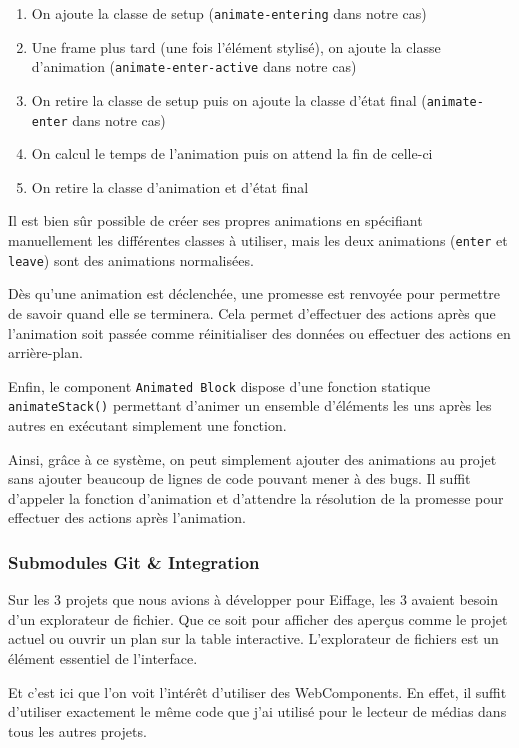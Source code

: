 \begin{enumerate}
    \item On ajoute la classe de setup (\texttt{animate-entering} dans notre cas)
    \item Une frame plus tard (une fois l'élément stylisé), on ajoute la classe d'animation (\texttt{animate-enter-active} dans notre cas)
    \item On retire la classe de setup puis on ajoute la classe d'état final (\texttt{animate-enter} dans notre cas)
    \item On calcul le temps de l'animation puis on attend la fin de celle-ci
    \item On retire la classe d'animation et d'état final
\end{enumerate}

Il est bien sûr possible de créer ses propres animations en spécifiant manuellement les différentes classes à utiliser, mais les deux animations (\texttt{enter} et \texttt{leave}) sont des animations normalisées.

Dès qu'une animation est déclenchée, une promesse est renvoyée pour permettre de savoir quand elle se terminera.
Cela permet d'effectuer des actions après que l'animation soit passée comme réinitialiser des données ou effectuer des actions en arrière-plan.

Enfin, le component \texttt{Animated Block} dispose d'une fonction statique \texttt{animateStack()} permettant d'animer un ensemble d'éléments les uns après les autres en exécutant simplement une fonction.

Ainsi, grâce à ce système, on peut simplement ajouter des animations au projet sans ajouter beaucoup de lignes de code pouvant mener à des bugs.
Il suffit d'appeler la fonction d'animation et d'attendre la résolution de la promesse pour effectuer des actions après l'animation.

\subsubsection{Submodules Git \& Integration}

Sur les 3 projets que nous avions à développer pour Eiffage, les 3 avaient besoin d'un explorateur de fichier.
Que ce soit pour afficher des aperçus comme le projet actuel ou ouvrir un plan sur la table interactive.
L'explorateur de fichiers est un élément essentiel de l'interface.

Et c'est ici que l'on voit l'intérêt d'utiliser des WebComponents.
En effet, il suffit d'utiliser exactement le même code que j'ai utilisé pour le lecteur de médias dans tous les autres projets.

